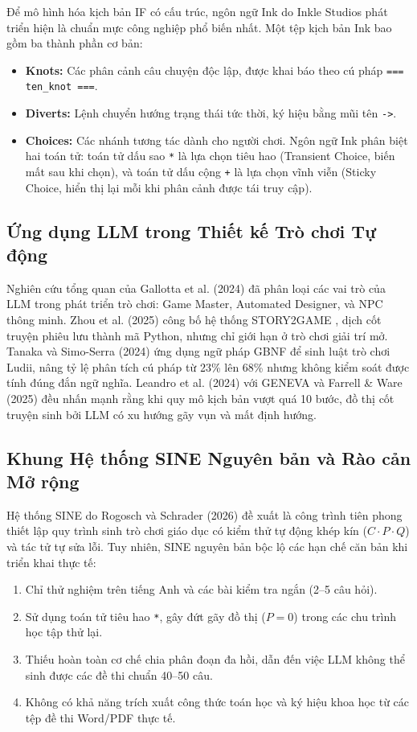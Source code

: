 \documentclass[conference]{IEEEtran}
\begin{document}
Để mô hình hóa kịch bản IF có cấu trúc, ngôn ngữ Ink do Inkle Studios phát triển \cite{ink2025} hiện là chuẩn mực công nghiệp phổ biến nhất. Một tệp kịch bản Ink bao gồm ba thành phần cơ bản:
\begin{itemize}
    \item \textbf{Knots:} Các phân cảnh câu chuyện độc lập, được khai báo theo cú pháp \texttt{=== ten\_knot ===}.
    \item \textbf{Diverts:} Lệnh chuyển hướng trạng thái tức thời, ký hiệu bằng mũi tên \texttt{->}.
    \item \textbf{Choices:} Các nhánh tương tác dành cho người chơi. Ngôn ngữ Ink phân biệt hai toán tử: toán tử dấu sao \texttt{*} là lựa chọn tiêu hao (Transient Choice, biến mất sau khi chọn), và toán tử dấu cộng \texttt{+} là lựa chọn vĩnh viễn (Sticky Choice, hiển thị lại mỗi khi phân cảnh được tái truy cập).
\end{itemize}

\subsection{Ứng dụng LLM trong Thiết kế Trò chơi Tự động}
Nghiên cứu tổng quan của Gallotta et al. (2024) \cite{gallotta2024} đã phân loại các vai trò của LLM trong phát triển trò chơi: Game Master, Automated Designer, và NPC thông minh. Zhou et al. (2025) công bố hệ thống STORY2GAME \cite{zhou2025}, dịch cốt truyện phiêu lưu thành mã Python, nhưng chỉ giới hạn ở trò chơi giải trí mở. Tanaka và Simo-Serra (2024) \cite{tanaka2024} ứng dụng ngữ pháp GBNF để sinh luật trò chơi Ludii, nâng tỷ lệ phân tích cú pháp từ 23\% lên 68\% nhưng không kiểm soát được tính đúng đắn ngữ nghĩa. Leandro et al. (2024) với GENEVA \cite{leandro2024} và Farrell \& Ware (2025) \cite{farrell2025} đều nhấn mạnh rằng khi quy mô kịch bản vượt quá 10 bước, đồ thị cốt truyện sinh bởi LLM có xu hướng gãy vụn và mất định hướng.

\subsection{Khung Hệ thống SINE Nguyên bản và Rào cản Mở rộng}
Hệ thống SINE do Rogosch và Schrader (2026) \cite{rogosch2026} đề xuất là công trình tiên phong thiết lập quy trình sinh trò chơi giáo dục có kiểm thử tự động khép kín ($C \cdot P \cdot Q$) và tác tử tự sửa lỗi. Tuy nhiên, SINE nguyên bản bộc lộ các hạn chế căn bản khi triển khai thực tế:
\begin{enumerate}
    \item Chỉ thử nghiệm trên tiếng Anh và các bài kiểm tra ngắn (2--5 câu hỏi).
    \item Sử dụng toán tử tiêu hao \texttt{*}, gây đứt gãy đồ thị ($P = 0$) trong các chu trình học tập thử lại.
    \item Thiếu hoàn toàn cơ chế chia phân đoạn đa hồi, dẫn đến việc LLM không thể sinh được các đề thi chuẩn 40--50 câu.
    \item Không có khả năng trích xuất công thức toán học và ký hiệu khoa học từ các tệp đề thi Word/PDF thực tế.
\end{enumerate}
\end{document}
